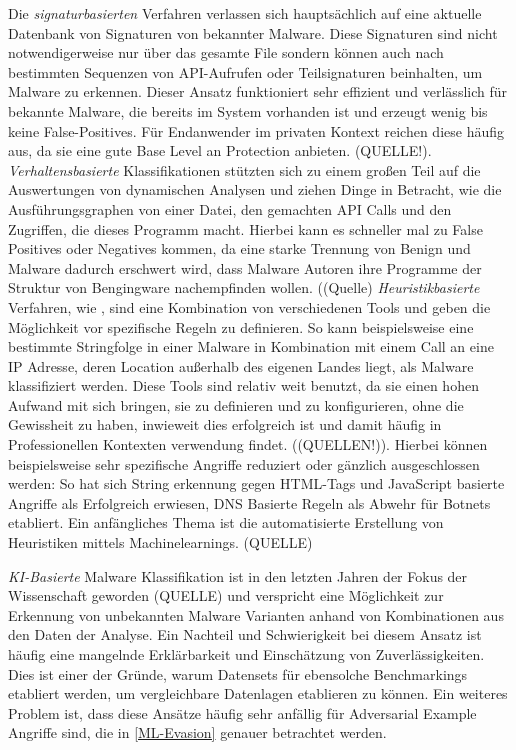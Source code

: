 Die \textit{signaturbasierten} Verfahren verlassen sich hauptsächlich auf eine aktuelle Datenbank von Signaturen von bekannter Malware. Diese Signaturen sind nicht notwendigerweise nur über das gesamte File sondern können auch nach bestimmten Sequenzen von API-Aufrufen oder Teilsignaturen beinhalten, um Malware zu erkennen. Dieser Ansatz funktioniert sehr effizient und verlässlich für bekannte Malware, die bereits im System vorhanden ist und erzeugt wenig bis keine False-Positives. Für Endanwender im privaten Kontext reichen diese häufig aus, da sie eine gute Base Level an Protection anbieten. (QUELLE!). 
\textit{Verhaltensbasierte} Klassifikationen stützten sich zu einem großen Teil auf die Auswertungen von dynamischen Analysen und ziehen Dinge in Betracht, wie die Ausführungsgraphen von einer Datei, den gemachten API Calls und den Zugriffen, die dieses Programm macht. Hierbei kann es schneller mal zu False Positives oder Negatives kommen, da eine starke Trennung von Benign und Malware dadurch erschwert wird, dass Malware Autoren ihre Programme der Struktur von Bengingware nachempfinden wollen. ((Quelle)
\textit{Heuristikbasierte} Verfahren, wie \cite{yara}, sind eine Kombination von verschiedenen Tools und geben die Möglichkeit vor spezifische Regeln zu definieren. So kann beispielsweise eine bestimmte Stringfolge in einer Malware in Kombination mit einem Call an eine IP Adresse, deren Location außerhalb des eigenen Landes liegt, als Malware klassifiziert werden. Diese Tools sind relativ weit benutzt, da sie einen hohen Aufwand mit sich bringen, sie zu definieren und zu konfigurieren, ohne die Gewissheit zu haben, inwieweit dies erfolgreich ist und damit häufig in Professionellen Kontexten verwendung findet. ((QUELLEN!)). Hierbei können beispielsweise sehr spezifische Angriffe reduziert oder gänzlich ausgeschlossen werden: So hat sich String erkennung gegen HTML-Tags und JavaScript basierte Angriffe als Erfolgreich erwiesen, DNS Basierte Regeln als Abwehr für Botnets etabliert. Ein anfängliches Thema ist die automatisierte Erstellung von Heuristiken mittels Machinelearnings. (QUELLE)

\textit{KI-Basierte} Malware Klassifikation ist in den letzten Jahren der Fokus der Wissenschaft geworden (QUELLE) und verspricht eine Möglichkeit zur Erkennung von unbekannten Malware Varianten anhand von Kombinationen aus den Daten der Analyse. Ein Nachteil und Schwierigkeit bei diesem Ansatz ist häufig eine mangelnde Erklärbarkeit und Einschätzung von Zuverlässigkeiten. Dies ist einer der Gründe, warum \cite{jiang_2024_benchmfc} Datensets für ebensolche Benchmarkings etabliert werden, um vergleichbare Datenlagen etablieren zu können. Ein weiteres Problem ist, dass diese Ansätze häufig sehr anfällig für Adversarial Example Angriffe sind, die in \ref{ML-Evasion} genauer betrachtet werden.